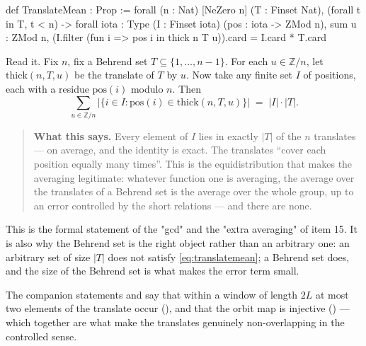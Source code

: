 \begin{seamnote}{}
{\footnotesize
\begin{leanquote}
def TranslateMean : Prop := forall (n : Nat) [NeZero n] (T :
  Finset Nat), (forall t in T, t < n) ->
forall {iota : Type} (I : Finset iota) (pos : iota -> ZMod
    n),
sum u : ZMod n, (I.filter (fun i => pos i in thick n T
      u)).card = I.card * T.card
\end{leanquote}
}
\end{seamnote}

Read it. Fix $n$, fix a Behrend set $T \subseteq \{1,\dots,n-1\}$. For each
$u \in \mathbb{Z}/n$, let $\mathrm{thick}(n, T, u)$ be the translate of $T$
by $u$. Now take any finite set $I$ of positions, each with a residue
$\mathrm{pos}(i)$ modulo $n$. Then
\begin{equation}
\sum_{u \in \mathbb{Z}/n} \bigl|\{i \in I : \mathrm{pos}(i) \in \mathrm{thick}(n,T,u)\}\bigr|
\;=\; |I| \cdot |T|.
\label{eq:translatemean}
\end{equation}

\begin{quote}
\textbf{What this says.} Every element of $I$ lies in exactly $|T|$ of the
$n$ translates --- on average, and the identity is exact. The translates
``cover each position equally many times''. This is the equidistribution
that makes the averaging legitimate: whatever function one is averaging, the
average over the translates of a Behrend set is the average over the whole
group, up to an error controlled by the short relations --- and there are none.
\end{quote}

This is the formal statement of the "gcd" and the "extra averaging" of item 15.
It is also why the Behrend set is the right object rather than an arbitrary
one: an arbitrary set of size $|T|$ does not satisfy \eqref{eq:translatemean};
a Behrend set does, and the size of the Behrend set is what makes the error
term small.

The companion statements  and  say that within
a window of length $2L$ at most two elements of the translate occur
(), and that the orbit map is injective () ---
which together are what make the translates genuinely non-overlapping in the
controlled sense.

